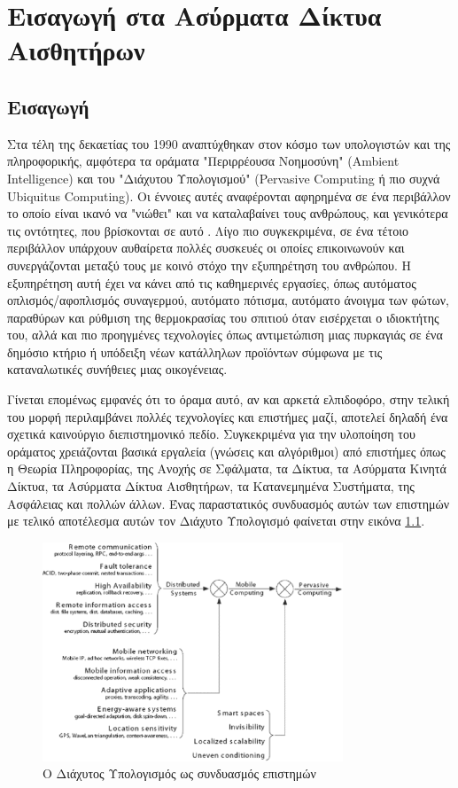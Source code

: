 


\chapter{Εισαγωγή στα Ασύρματα Δίκτυα Αισθητήρων}\label{ch:intro-wsns}

\section{Εισαγωγή}
Στα τέλη της δεκαετίας του 1990 αναπτύχθηκαν στον κόσμο των υπολογιστών και της πληροφορικής, αμφότερα τα οράματα "Περιρρέουσα Νοημοσύνη" (Ambient Intelligence) και
του "Διάχυτου Υπολογισμού" (Pervasive Computing ή πιο συχνά Ubiquitus Computing).
Οι έννοιες αυτές αναφέρονται αφηρημένα σε ένα περιβάλλον το οποίο είναι ικανό να "νιώθει" και να καταλαβαίνει τους ανθρώπους, και γενικότερα
τις οντότητες, που βρίσκονται σε αυτό \cite{ambient}.
Λίγο πιο συγκεκριμένα, σε ένα τέτοιο περιβάλλον υπάρχουν αυθαίρετα πολλές συσκευές οι οποίες επικοινωνούν και συνεργάζονται μεταξύ τους με κοινό στόχο την εξυπηρέτηση
του ανθρώπου.
Η εξυπηρέτηση αυτή έχει να κάνει από τις καθημερινές εργασίες, όπως αυτόματος οπλισμός/αφοπλισμός συναγερμού, αυτόματο πότισμα, αυτόματο άνοιγμα των φώτων, παραθύρων
και ρύθμιση της θερμοκρασίας του σπιτιού όταν εισέρχεται ο ιδιοκτήτης του, αλλά και πιο προηγμένες τεχνολογίες όπως αντιμετώπιση μιας πυρκαγιάς σε ένα δημόσιο κτήριο
ή υπόδειξη νέων κατάλληλων
προϊόντων σύμφωνα με τις καταναλωτικές συνήθειες μιας οικογένειας.

Γίνεται επομένως εμφανές ότι το όραμα αυτό, αν και αρκετά ελπιδοφόρο, στην τελική του μορφή περιλαμβάνει πολλές τεχνολογίες και επιστήμες μαζί, αποτελεί δηλαδή ένα
σχετικά καινούργιο διεπιστημονικό πεδίο.
Συγκεκριμένα για την υλοποίηση του οράματος χρειάζονται βασικά εργαλεία (γνώσεις και αλγόριθμοι) από επιστήμες όπως η Θεωρία Πληροφορίας, της Ανοχής σε Σφάλματα,
τα Δίκτυα, τα Ασύρματα Κινητά Δίκτυα, τα Ασύρματα Δίκτυα Αισθητήρων, τα Κατανεμημένα Συστήματα, της Ασφάλειας και πολλών άλλων. Ένας παραστατικός συνδυασμός αυτών
των επιστημών με τελικό αποτέλεσμα αυτών τον Διάχυτο Υπολογισμό φαίνεται στην εικόνα \ref{fig:pervasive}.

\begin{figure}[h]
  \centering
  \includegraphics[width=0.8\textwidth]{images/pervasive_computing.eps}
  \caption[Caption for LOF]{Ο Διάχυτος Υπολογισμός ως συνδυασμός επιστημών\footnotemark}
  \label{fig:pervasive}
\end{figure}

